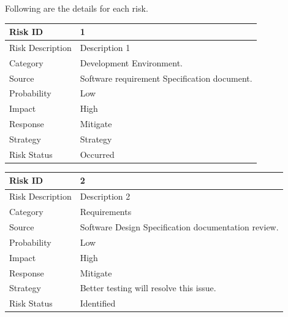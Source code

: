 \documentclass[oneside,a4paper,12pt]{report}
\begin{document}
Following are the details for each risk.
\begin{table}[!htbp]
\begin{center}
\def\arraystretch{1.5}
\begin{tabularx}{\textwidth}{| l | X |}
\hline
Risk ID	& 1 \\ \hline
Risk Description	& Description 1 \\ \hline
Category	& Development Environment. \\ \hline
Source	& Software requirement Specification document. \\ \hline
Probability	& Low \\ \hline
Impact	& High \\ \hline
Response	& Mitigate \\ \hline
Strategy	& Strategy \\ \hline
Risk Status	& Occurred \\ \hline
\end{tabularx}
\end{center}
\label{tab:risk1}
\end{table}

\begin{table}[!htbp]
\begin{center}
\def\arraystretch{1.5}
\begin{tabularx}{\textwidth}{| l | X |}
\hline
Risk ID	& 2 \\ \hline
Risk Description	& Description 2 \\ \hline
Category	& Requirements \\ \hline
Source	& Software Design Specification documentation review. \\ \hline
Probability	& Low \\ \hline
Impact	& High \\ \hline
Response	& Mitigate \\ \hline
Strategy	& Better testing will resolve this issue.  \\ \hline
Risk Status	& Identified \\ \hline
\end{tabularx}
\end{center}
\label{tab:risk2}
\end{table}
\end{document}
